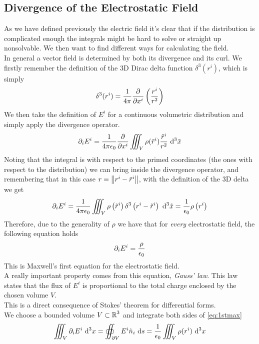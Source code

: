 \documentclass[../electromagnetism]{subfiles}
\begin{document}
\subsection{Divergence of the Electrostatic Field}
As we have defined previously the electric field it's clear that if the distribution is complicated enough the integrals might be hard to solve or straight up nonsolvable. We then want to find different ways for calculating the field.\\
In general a vector field is determined by both its divergence and its curl. We firstly remember the definition of the 3D Dirac delta function $\delta^3(r^i)$, which is simply
\begin{equation}
	\delta^3(r^i)=\frac{1}{4\pi}\pdv{x^i}\left( \frac{r^i}{r^2} \right)
	\label{eq:delta3r}
\end{equation}
We then take the definition of $E^i$ for a continuous volumetric distribution and simply apply the divergence operator.
\begin{equation}
	\partial_iE^i=\frac{1}{4\pi\epsilon_0}\pdv{x^i}\iiint_{V}^{}\rho(\tilde{r}^i)\frac{\hat{r}^i}{r^2}\ \mathrm{d}^3\tilde{x}
	\label{eq:Ediv}
\end{equation}
Noting that the integral is with respect to the primed coordinates (the ones with respect to the distribution) we can bring inside the divergence operator, and remembering that in this case $r=\norm{r^i-\tilde{r}^i}$, with the definition of the 3D delta we get
\begin{equation*}
	\partial_iE^i=\frac{1}{4\pi\epsilon_0}\iiint_V\rho\left( \tilde{r}^i \right)\delta^3\left( r^i-\tilde{r}^i \right)\ \mathrm{d}^3\tilde{x}=\frac{1}{\epsilon_0}\rho\left( r^i \right)
\end{equation*}
Therefore, due to the generality of $\rho$ we have that for \textit{every} electrostatic field, the following equation holds
\begin{equation}
	\partial_iE^i=\frac{\rho}{\epsilon_0}
	\label{eq:1stmax}
\end{equation}
This is Maxwell's first equation for the electrostatic field.\\
A really important property comes from this equation, \textit{Gauss' law}. This law states that the flux of $E^i$ is proportional to the total charge enclosed by the chosen volume $V$.\\
This is a direct consequence of Stokes' theorem for differential forms.\\
We choose a bounded volume $V\subset\operatorname{\mathbb{R}}^3$ and integrate both sides of \eqref{eq:1stmax}
\begin{equation*}
	\iiint_V\partial_iE^i\ \mathrm{d}^3x=\oiint_{\partial V}E^i\hat{n}_i\ \mathrm{d} s=\frac{1}{\epsilon_0}\iiint_V\rho(r^i)\ \mathrm{d}^3x
\end{equation*}
\end{document}
